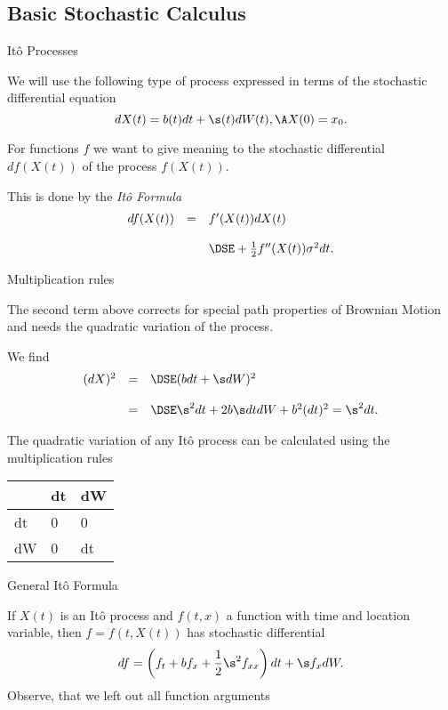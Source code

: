 
\subsection{Basic Stochastic Calculus}

{ It{\^o} Processes}


	We will use the following type of process expressed
in terms of the stochastic differential equation
$$
dX(t) = b(t) dt + \s(t) dW(t), \A X(0) = x_0.
$$

	For functions $f$ we want to give  meaning to the stochastic differential
$df(X(t))$ of the process $f(X(t))$.

	This is done by the {\it It{\^o} Formula}
$$
\begin{array}{lll}
df(X(t)) &=& f'(X(t)) dX(t)\\*[12pt]
&& \DSE+ \frac{1}{2} f''(X(t)) \sigma^2 dt.
\end{array}
$$


{Multiplication rules}


	The second term above corrects for special path properties of
Brownian Motion and needs the quadratic variation of the process.

	We find
$$
\begin{array}{lll}
(d X)^2 &=&\DSE (b dt + \s dW)^2 \\*[12pt]
&=&\DSE \s^2 dt + 2 b \s dt dW + b^2 (dt)^2 = \s^2 dt.
\end{array}
$$

	The quadratic variation of any It{\^o} process can be calculated
using the multiplication rules\\
\begin{center}
\begin{tabular}{|l|ll|}
\hline
& dt &dW \\\hline
dt& 0 & 0\\
dW & 0 &dt \\\hline
\end{tabular}
\end{center}


{ General It{\^o} Formula}

If $X(t)$ is an It{\^o} process  and $f(t,x)$ a function with time and location variable, then
$f = f(t,X(t))$ has stochastic differential
$$
df = \left(f_t + b f_x + \frac{1}{2} \s^2 f_{xx}\right) dt + \s
f_x dW.
$$
Observe, that we left out all function arguments

